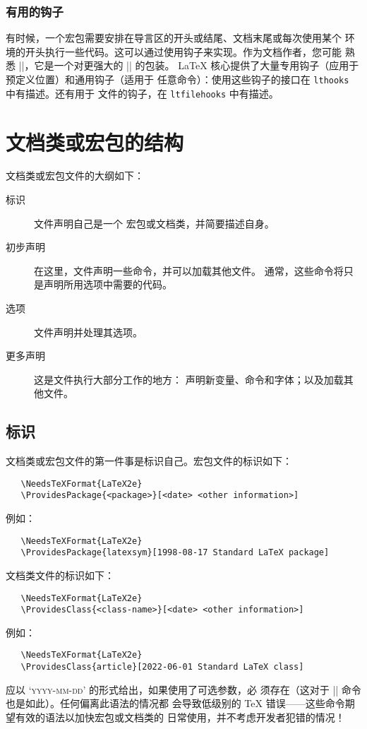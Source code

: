 \documentclass{ltxguide}
\begin{document}
\subsubsection{有用的钩子}

有时候，一个宏包需要安排在导言区的开头或结尾、文档末尾或每次使用某个
环境的开头执行一些代码。这可以通过使用钩子来实现。作为文档作者，您可能
熟悉 |\AtBeginDocument|，它是一个对更强大的 |\AddToHook| 的包装。
\LaTeX{} 核心提供了大量专用钩子（应用于预定义位置）和通用钩子（适用于
任意命令）：使用这些钩子的接口在 \texttt{lthooks} 中有描述。还有用于
文件的钩子，在 \texttt{ltfilehooks} 中有描述。

\section{文档类或宏包的结构}
\label{Sec:structure}

文档类或宏包文件的大纲如下：
\begin{description}
   \item[标识] 文件声明自己是一个 \LaTeXe{} 宏包或文档类，并简要描述自身。
   \item[初步声明] 在这里，文件声明一些命令，并可以加载其他文件。
         通常，这些命令将只是声明所用选项中需要的代码。
   \item[选项] 文件声明并处理其选项。
   \item[更多声明] 这是文件执行大部分工作的地方：
         声明新变量、命令和字体；以及加载其他文件。
\end{description}

\subsection{标识}

文档类或宏包文件的第一件事是标识自己。宏包文件的标识如下：
\begin{verbatim}
   \NeedsTeXFormat{LaTeX2e}
   \ProvidesPackage{<package>}[<date> <other information>]
\end{verbatim}
例如：
\begin{verbatim}
   \NeedsTeXFormat{LaTeX2e}
   \ProvidesPackage{latexsym}[1998-08-17 Standard LaTeX package]
\end{verbatim}
文档类文件的标识如下：
\begin{verbatim}
   \NeedsTeXFormat{LaTeX2e}
   \ProvidesClass{<class-name>}[<date> <other information>]
\end{verbatim}
例如：
\begin{verbatim}
   \NeedsTeXFormat{LaTeX2e}
   \ProvidesClass{article}[2022-06-01 Standard LaTeX class]
\end{verbatim}
 应以 `\textsc{yyyy-mm-dd}' 的形式给出，如果使用了可选参数，必
须存在（这对于 |\NeedsTeXFormat| 命令也是如此）。任何偏离此语法的情况都
会导致低级别的 \TeX{} 错误——这些命令期望有效的语法以加快宏包或文档类的
日常使用，并不考虑开发者犯错的情况！
\end{document}
